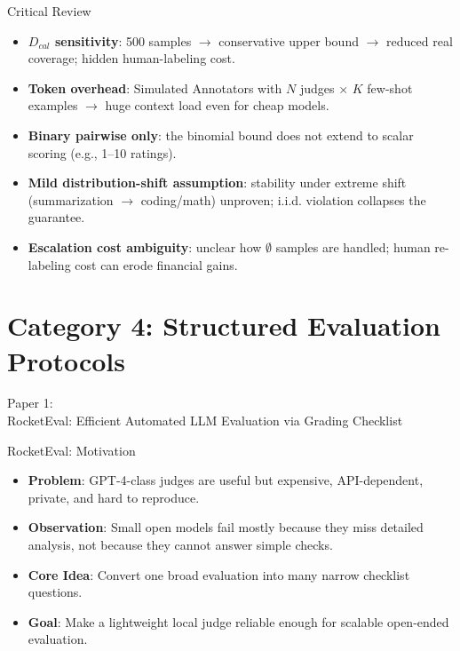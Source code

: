 \documentclass[10pt]{beamer}
\begin{document}
\begin{frame}{Critical Review}
  \begin{itemize}
    \item \textbf{$D_{cal}$ sensitivity}: 500 samples $\rightarrow$ conservative upper bound $\rightarrow$ reduced real coverage; hidden human-labeling cost.
    \item \textbf{Token overhead}: Simulated Annotators with $N$ judges $\times$ $K$ few-shot examples $\rightarrow$ huge context load even for cheap models.
    \item \textbf{Binary pairwise only}: the binomial bound does not extend to scalar scoring (e.g., 1--10 ratings).
    \item \textbf{Mild distribution-shift assumption}: stability under extreme shift (summarization $\rightarrow$ coding/math) unproven; i.i.d. violation collapses the guarantee.
    \item \textbf{Escalation cost ambiguity}: unclear how $\emptyset$ samples are handled; human re-labeling cost can erode financial gains.
  \end{itemize}
\end{frame}



\section{Category 4: Structured Evaluation Protocols}


\begin{frame}[standout]
  \hypertarget{paper1}{}
  \Large Paper 1:\\RocketEval: Efficient Automated LLM Evaluation via Grading Checklist
\end{frame}

\begin{frame}{RocketEval: Motivation}
  \begin{itemize}
    \item \textbf{Problem}: GPT-4-class judges are useful but expensive, API-dependent, private, and hard to reproduce.
    \item \textbf{Observation}: Small open models fail mostly because they miss detailed analysis, not because they cannot answer simple checks.
    \item \textbf{Core Idea}: Convert one broad evaluation into many narrow checklist questions.
    \item \textbf{Goal}: Make a lightweight local judge reliable enough for scalable open-ended evaluation.
  \end{itemize}
\end{frame}
\end{document}
